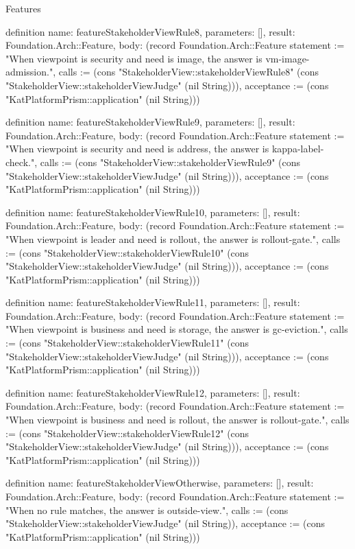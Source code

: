 \begin{lexlean}{Features}
\begin{semanticmodule}
definition{
  name: featureStakeholderViewRule8,
  parameters: [],
  result: Foundation.Arch::Feature,
  body: (record Foundation.Arch::Feature {statement := "When viewpoint is security and need is image, the answer is vm-image-admission.", calls := (cons "StakeholderView::stakeholderViewRule8" (cons "StakeholderView::stakeholderViewJudge" (nil String))), acceptance := (cons "KatPlatformPrism::application" (nil String))})
}

definition{
  name: featureStakeholderViewRule9,
  parameters: [],
  result: Foundation.Arch::Feature,
  body: (record Foundation.Arch::Feature {statement := "When viewpoint is security and need is address, the answer is kappa-label-check.", calls := (cons "StakeholderView::stakeholderViewRule9" (cons "StakeholderView::stakeholderViewJudge" (nil String))), acceptance := (cons "KatPlatformPrism::application" (nil String))})
}

definition{
  name: featureStakeholderViewRule10,
  parameters: [],
  result: Foundation.Arch::Feature,
  body: (record Foundation.Arch::Feature {statement := "When viewpoint is leader and need is rollout, the answer is rollout-gate.", calls := (cons "StakeholderView::stakeholderViewRule10" (cons "StakeholderView::stakeholderViewJudge" (nil String))), acceptance := (cons "KatPlatformPrism::application" (nil String))})
}

definition{
  name: featureStakeholderViewRule11,
  parameters: [],
  result: Foundation.Arch::Feature,
  body: (record Foundation.Arch::Feature {statement := "When viewpoint is business and need is storage, the answer is gc-eviction.", calls := (cons "StakeholderView::stakeholderViewRule11" (cons "StakeholderView::stakeholderViewJudge" (nil String))), acceptance := (cons "KatPlatformPrism::application" (nil String))})
}

definition{
  name: featureStakeholderViewRule12,
  parameters: [],
  result: Foundation.Arch::Feature,
  body: (record Foundation.Arch::Feature {statement := "When viewpoint is business and need is rollout, the answer is rollout-gate.", calls := (cons "StakeholderView::stakeholderViewRule12" (cons "StakeholderView::stakeholderViewJudge" (nil String))), acceptance := (cons "KatPlatformPrism::application" (nil String))})
}

definition{
  name: featureStakeholderViewOtherwise,
  parameters: [],
  result: Foundation.Arch::Feature,
  body: (record Foundation.Arch::Feature {statement := "When no rule matches, the answer is outside-view.", calls := (cons "StakeholderView::stakeholderViewJudge" (nil String)), acceptance := (cons "KatPlatformPrism::application" (nil String))})
}


\end{semanticmodule}
\end{lexlean}
